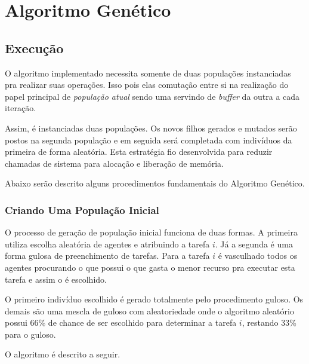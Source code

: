 \documentclass[portugues, brazil, a4paper,12pt]{article}
\begin{document}
\section{Algoritmo Genético}

	\subsection{Execução}
		O algoritmo implementado necessita somente de duas populações instanciadas pra realizar suas operações. Isso pois elas comutação entre si na realização do papel principal de \textit{população atual} sendo uma servindo de \textit{buffer} da outra a cada iteração.

		Assim, é instanciadas duas populações. Os novos filhos gerados e mutados serão postos na segunda população e em seguida será completada com indivíduos da primeira de forma aleatória. Esta estratégia fio desenvolvida para reduzir chamadas de sistema para alocação e liberação de memória.
		
		Abaixo serão descrito alguns procedimentos fundamentais do Algoritmo Genético.

		\subsubsection{Criando Uma População Inicial}
			O processo de geração de população inicial funciona de duas formas. A primeira utiliza escolha aleatória de agentes e atribuindo a tarefa $i$. Já a segunda é uma forma gulosa de preenchimento de tarefas. Para a tarefa $i$ é vasculhado todos os agentes procurando o que possui o que gasta o menor recurso pra executar esta tarefa e assim o é escolhido.

			O primeiro indivíduo escolhido é gerado totalmente pelo procedimento guloso. Os demais são uma mescla de guloso com aleatoriedade onde o algoritmo aleatório possui 66\% de chance de ser escolhido para determinar a tarefa $i$, restando 33\% para o guloso.

			O algoritmo é descrito a seguir.
\end{document}
